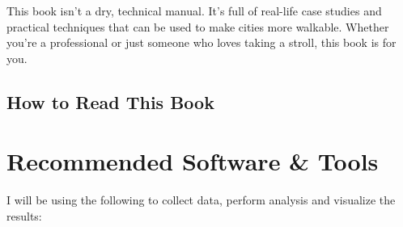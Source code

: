 \documentclass[
]{latex/krantz}
\begin{document}
This book isn't a dry, technical manual. It's full of real-life case studies and practical techniques that can be used to make cities more walkable. Whether you're a professional or just someone who loves taking a stroll, this book is for you.

\hypertarget{how-to-read-this-book}{%
\subsection{How to Read This Book}\label{how-to-read-this-book}}

\hypertarget{recommended-software-tools}{%
\section{Recommended Software \& Tools}\label{recommended-software-tools}}

I will be using the following to collect data, perform analysis and visualize the results:
\end{document}
